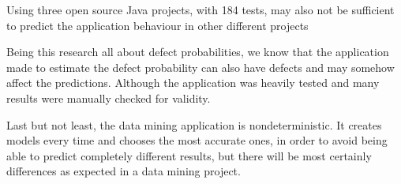 Using three open source Java projects, with 184 tests, may also not be sufficient to predict the application behaviour in other different projects

Being this research all about defect probabilities, we know that the application made to estimate the defect probability can also have defects and may somehow affect the predictions. Although the application was heavily tested and many results were manually checked for validity.

Last but not least, the data mining application is nondeterministic. It creates models every time and chooses the most accurate ones, in order to avoid being able to predict completely different results, but there will be most certainly differences as expected in a data mining project.
